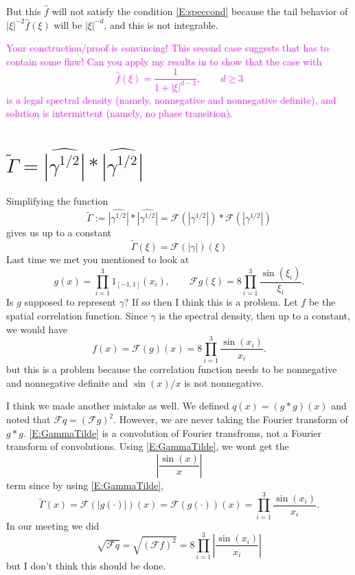 \documentclass{article}
\numberwithin{equation}{section}
\begin{document}
But this $\hat{f}$ will not satisfy the condition \eqref{E:speccond} because the tail behavior of $|\xi|^{-2}\hat{f}(\xi)$ will be $|\xi|^{-d}$, and this is not integrable.

\bigskip
\textcolor{magenta}{Your construction/proof is convincing! This second case suggests that
\cite{TZ98} has to contain some flaw! Can you apply my results in \cite{CK19} to show that the case
with
\begin{equation*}
	\widehat{f} (\xi) = \frac{1}{1+|\xi|^{d-2}} , \qquad d\ge 3
\end{equation*}
is a legal spectral density (namely, nonnegative and nonnegative definite), and solution is
intermittent (namely, no phase transition).
}

\section{$\tilde{\Gamma} = \widehat{|\gamma^{1/2}|} *  \widehat{|\gamma^{1/2}|}$  }
Simplifying the function
	\begin{equation}\label{E:GammaTilde}
		\tilde{\Gamma} := \widehat{|\gamma^{1/2}|} *  \widehat{|\gamma^{1/2}|} = \mathcal{F}(|\gamma^{1/2}|) * \mathcal{F}(|\gamma^{1/2}|)
	\end{equation}
gives us up to a constant
	\[
		\tilde{\Gamma}(\xi) = \mathcal{F}(|\gamma|)(\xi)
	\]
Last time we met you mentioned to look at
	\[
		g(x) = \prod_{i=1}^3 1_{[-1,1]}(x_i), \quad \quad \mathcal{F}g(\xi) = 8\prod_{i=1}^3 \frac{\sin(\xi_i)}{\xi_i}.
	\]
Is $g$ supposed to represent $\gamma$? If so then I think this is a problem. Let $f$ be the spatial correlation function. Since $\gamma$ is the spectral density, then up to a constant, we would have
	\[
		f(x) = \mathcal{F}(g)(x) = 8\prod_{i=1}^3 \frac{\sin(x_i)}{x_i}.
	\]
but this is a problem because the correlation function needs to be nonnegative and nonnegative definite and $\sin(x)/x$ is not nonnegative.

I think we made another mistake as well. We defined $q(x) = (g*g)(x)$ and noted that $\mathcal{F}q = (\mathcal{F}g)^2$. However, we are never taking the Fourier transform of $g*g$. \eqref{E:GammaTilde} is a convolution of Fourier transfroms, not a Fourier transform of convolutions. Using \eqref{E:GammaTilde}, we wont get the
	\[
		\left|\frac{\sin(x)}{x}\right|
	\]
term since by using \eqref{E:GammaTilde},
	\[
		\tilde{\Gamma}(x) = \mathcal{F}\left( |g(\cdot)| \right)(x)  = \mathcal{F}\left( g(\cdot)\right)(x) = \prod_{i=1}^3\frac{\sin(x_i)}{x_i}.
	\]
In our meeting we did
	\[
		\sqrt{\mathcal{F}q} = \sqrt{(\mathcal{F}f)^2} = 8\prod_{i=1}^3 \left| \frac{\sin(x_i)}{x_i} \right|
	\]
but I don't think this should be done.
\end{document}
